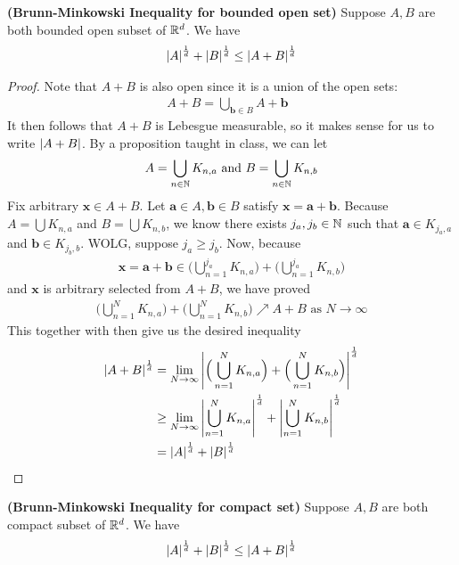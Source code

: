 \documentclass{report}
\begin{document}
\begin{theorem}
\label{BMIo}
\textbf{(Brunn-Minkowski Inequality for bounded open set)} Suppose $A,B$ are both bounded open subset of  $\mathbb{R}^d$. We have 
 \begin{align*}
\left|A\right|^{\frac{1}{d}}+ \left|B\right|^{\frac{1}{d}}\leq \left|A+B\right|^{\frac{1}{d}}
\end{align*}
\end{theorem}
\begin{proof}
Note that  $A+B$ is also open since it is a union of the open sets:
\begin{align*}
A+B=\bigcup_{\textbf{b}\in B}A+\textbf{b}\text{ }
\end{align*}
It then follows that $A+B$ is Lebesgue measurable, so it makes sense for us to write  $\left|A+B\right|$. By a proposition taught in class, we can let 
\begin{align*}
A=\bigcup_{n\in\mathbb{N}}K_{n,a}\text{ and }B=\bigcup_{n\in\mathbb{N}}K_{n,b}
\end{align*}
Fix arbitrary $\textbf{x}\in A+B$. Let $\textbf{a} \in A,\textbf{b}\in B$ satisfy $\textbf{x}=\textbf{a}+\textbf{b}$. Because $A=\bigcup K_{n,a}$ and $B=\bigcup K_{n,b}$, we know there exists $j_a,j_b \in\mathbb{N}$ such that $\textbf{a} \in K_{j_a,a}$ and $\textbf{b} \in K_{j_b,b}$. WOLG, suppose $j_a\geq j_b$. Now, because 
\begin{align*}
  \textbf{x}=\textbf{a}+\textbf{b}\in \Big(\bigcup_{n=1}^{j_a} K_{n,a} \Big) + \Big(\bigcup_{n=1}^{j_a}K_{n,b} \Big)
\end{align*}
and $\textbf{x}$ is arbitrary selected from $A+B$, we have proved
\begin{align*}
  \Big(\bigcup_{n=1}^N K_{n,a} \Big) + \Big(\bigcup_{n=1}^N K_{n,b} \Big) \nearrow A+B\text{ as }N \to \infty
\end{align*}
This together with  then give us the desired inequality  
\begin{align*}
\left|A+B\right|^{\frac{1}{d}}&=\lim_{N\to \infty} \left|\Big(\bigcup_{n=1}^N K_{n,a} \Big) + \Big( \bigcup_{n=1}^N K_{n,b}  \Big)\right|^{\frac{1}{d}}\\
&\geq \lim_{N\to \infty} \left|\bigcup_{n=1}^N K_{n,a}\right|^{\frac{1}{d}}+ \left|\bigcup_{n=1}^N K_{n,b}\right|^{\frac{1}{d}}\\
&=\left|A\right|^{\frac{1}{d}}+\left|B\right|^{\frac{1}{d}}
\end{align*}
\end{proof}
\begin{theorem}
\label{BMIc}
\textbf{(Brunn-Minkowski Inequality for compact set)} Suppose $A,B$ are both compact subset of  $\mathbb{R}^d$. We have 
 \begin{align*}
\left|A\right|^{\frac{1}{d}}+ \left|B\right|^{\frac{1}{d}}\leq  \left|A+B\right|^{\frac{1}{d}}
\end{align*}
\end{theorem}
\end{document}

